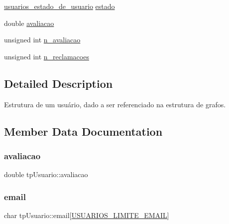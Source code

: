\begin{DoxyCompactItemize}
\item 
\hyperlink{usuarios_8h_a8cd77fbce66dcd741fd482cc4f01a072}{usuarios\+\_\+estado\+\_\+de\+\_\+usuario} \hyperlink{structtpUsuario_a835c8318c94d180fa9acff958928f99c}{estado}
\item 
double \hyperlink{structtpUsuario_a77b90005823f08782b8f1234d2e8fe04}{avaliacao}
\item 
unsigned int \hyperlink{structtpUsuario_a70b3d82559295586f146eb113c18aef2}{n\+\_\+avaliacao}
\item 
unsigned int \hyperlink{structtpUsuario_a4aed6ac960a0dfadc0a3f8c2777b3709}{n\+\_\+reclamacoes}
\end{DoxyCompactItemize}


\subsection{Detailed Description}
Estrutura de um usuário, dado a ser referenciado na estrutura de grafos. 

\subsection{Member Data Documentation}
\mbox{\label{structtpUsuario_a77b90005823f08782b8f1234d2e8fe04}} 
\subsubsection{\texorpdfstring{avaliacao}{avaliacao}}
{\footnotesize\ttfamily double tp\+Usuario\+::avaliacao}

\mbox{\label{structtpUsuario_a673f3e426609e9e216190ebd1f2d2fd5}} 
\subsubsection{\texorpdfstring{email}{email}}
{\footnotesize\ttfamily char tp\+Usuario\+::email\mbox{[}\hyperlink{usuarios_8h_a75359d1394ac8ddf5e80583806d54623}{U\+S\+U\+A\+R\+I\+O\+S\+\_\+\+L\+I\+M\+I\+T\+E\+\_\+\+E\+M\+A\+IL}\mbox{]}}

\mbox{\label{structtpUsuario_a7e58e7062d1b1bdd6e9da9468ef28d71}} 
